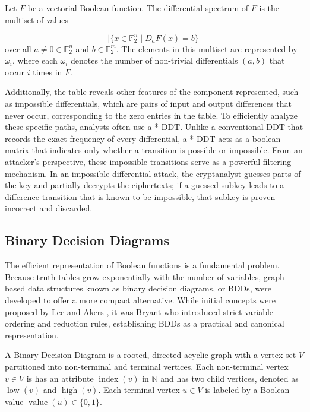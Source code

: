 \begin{definition}
    \label{def:differential-spectrum}

    Let $F$ be a vectorial Boolean function. The differential spectrum of $F$ is the multiset of values

    \begin{equation*}
        \big| \{ x \in \mathbb{F}_{2}^{n} \mid D_{a}F(x) = b \} \big|
    \end{equation*}
    over all $a \neq 0 \in \mathbb{F}_{2}^{n}$ and $b \in \mathbb{F}_{2}^{m}$. The elements in this multiset are represented by $\omega_{i}$, where each $\omega_{i}$ denotes the number of non-trivial differentials $(a, b)$ that occur $i$ times in $F$.
\end{definition}

Additionally, the table reveals other features of the component represented, such as impossible differentials, which are pairs of input and output differences that never occur, corresponding to the zero entries in the table. To efficiently analyze these specific paths, analysts often use a *-DDT. Unlike a conventional DDT that records the exact frequency of every differential, a *-DDT acts as a boolean matrix that indicates only whether a transition is possible or impossible. From an attacker's perspective, these impossible transitions serve as a powerful filtering mechanism. In an impossible differential attack, the cryptanalyst guesses parts of the key and partially decrypts the ciphertexts; if a guessed subkey leads to a difference transition that is known to be impossible, that subkey is proven incorrect and discarded.

\subsection{Binary Decision Diagrams}

The efficient representation of Boolean functions is a fundamental problem. Because truth tables grow exponentially with the number of variables, graph-based data structures known as binary decision diagrams, or BDDs, were developed to offer a more compact alternative. While initial concepts were proposed by Lee \cite{Lee1959} and Akers \cite{Akers1978}, it was Bryant who introduced strict variable ordering and reduction rules, establishing BDDs as a practical and canonical representation.

\begin{definition}
\label{def:state-equivalence}
    A Binary Decision Diagram is a rooted, directed acyclic graph with a vertex set $V$ partitioned into non-terminal and terminal vertices. Each non-terminal vertex $v \in V$ is has an attribute $\operatorname{index}(v)$ in $\mathbb{N}$ and has two child vertices, denoted as $\operatorname{low}(v)$ and $\operatorname{high}(v)$. Each terminal vertex $u \in V$ is labeled by a Boolean value $\operatorname{value}(u) \in \{0, 1\}$.
\end{definition}

